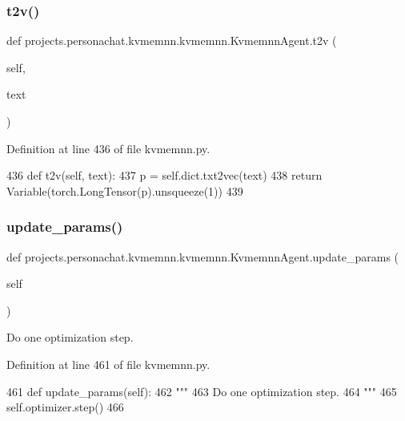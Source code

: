 \subsubsection{\texorpdfstring{t2v()}{t2v()}}
{\footnotesize\ttfamily def projects.\+personachat.\+kvmemnn.\+kvmemnn.\+Kvmemnn\+Agent.\+t2v (\begin{DoxyParamCaption}\item[{}]{self,  }\item[{}]{text }\end{DoxyParamCaption})}



Definition at line 436 of file kvmemnn.\+py.


\begin{DoxyCode}
436     \textcolor{keyword}{def }t2v(self, text):
437         p = self.dict.txt2vec(text)
438         \textcolor{keywordflow}{return} Variable(torch.LongTensor(p).unsqueeze(1))
439 
\end{DoxyCode}
\mbox{\label{classprojects_1_1personachat_1_1kvmemnn_1_1kvmemnn_1_1KvmemnnAgent_a9760c8b1b1b905f09de43413ad51a69b}} 
\subsubsection{\texorpdfstring{update\+\_\+params()}{update\_params()}}
{\footnotesize\ttfamily def projects.\+personachat.\+kvmemnn.\+kvmemnn.\+Kvmemnn\+Agent.\+update\+\_\+params (\begin{DoxyParamCaption}\item[{}]{self }\end{DoxyParamCaption})}

\begin{DoxyVerb}Do one optimization step.
\end{DoxyVerb}
 

Definition at line 461 of file kvmemnn.\+py.


\begin{DoxyCode}
461     \textcolor{keyword}{def }update\_params(self):
462         \textcolor{stringliteral}{"""}
463 \textcolor{stringliteral}{        Do one optimization step.}
464 \textcolor{stringliteral}{        """}
465         self.optimizer.step()
466 
\end{DoxyCode}
\mbox{\label{classprojects_1_1personachat_1_1kvmemnn_1_1kvmemnn_1_1KvmemnnAgent_a07a7ef79c4bae6151aad5b7b765be9bc}} 
